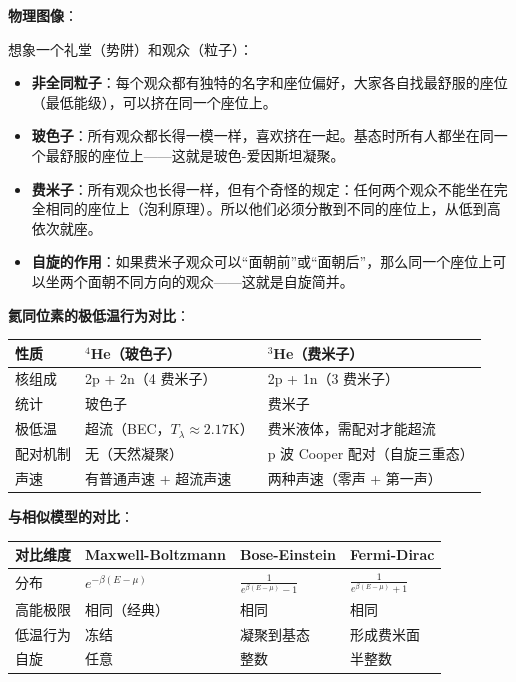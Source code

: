 \begin{insightbox}[物理图像与模型关联]
\textbf{物理图像}：

想象一个礼堂（势阱）和观众（粒子）：
\begin{itemize}[nosep]
    \item \textbf{非全同粒子}：每个观众都有独特的名字和座位偏好，大家各自找最舒服的座位（最低能级），可以挤在同一个座位上。
    \item \textbf{玻色子}：所有观众都长得一模一样，喜欢挤在一起。基态时所有人都坐在同一个最舒服的座位上——这就是玻色-爱因斯坦凝聚。
    \item \textbf{费米子}：所有观众也长得一样，但有个奇怪的规定：任何两个观众不能坐在完全相同的座位上（泡利原理）。所以他们必须分散到不同的座位上，从低到高依次就座。
    \item \textbf{自旋的作用}：如果费米子观众可以``面朝前''或``面朝后''，那么同一个座位上可以坐两个面朝不同方向的观众——这就是自旋简并。
\end{itemize}

\textbf{氦同位素的极低温行为对比}：
\begin{center}
\begin{tabular}{lll}
\toprule
\textbf{性质} & \textbf{$^4$He（玻色子）} & \textbf{$^3$He（费米子）} \\
\midrule
核组成 & 2p + 2n（4 费米子） & 2p + 1n（3 费米子） \\
统计 & 玻色子 & 费米子 \\
极低温 & 超流（BEC，$T_\lambda\approx2.17$K） & 费米液体，需配对才能超流 \\
配对机制 & 无（天然凝聚） & p 波 Cooper 配对（自旋三重态） \\
声速 & 有普通声速 + 超流声速 & 两种声速（零声 + 第一声） \\
\bottomrule
\end{tabular}
\end{center}

\textbf{与相似模型的对比}：
\begin{center}
\begin{tabular}{llll}
\toprule
\textbf{对比维度} & \textbf{Maxwell-Boltzmann} & \textbf{Bose-Einstein} & \textbf{Fermi-Dirac} \\
\midrule
分布 & $e^{-\beta(E-\mu)}$ & $\frac{1}{e^{\beta(E-\mu)}-1}$ & $\frac{1}{e^{\beta(E-\mu)}+1}$ \\
高能极限 & 相同（经典） & 相同 & 相同 \\
低温行为 & 冻结 & 凝聚到基态 & 形成费米面 \\
自旋 & 任意 & 整数 & 半整数 \\
\bottomrule
\end{tabular}
\end{center}


\end{insightbox}
